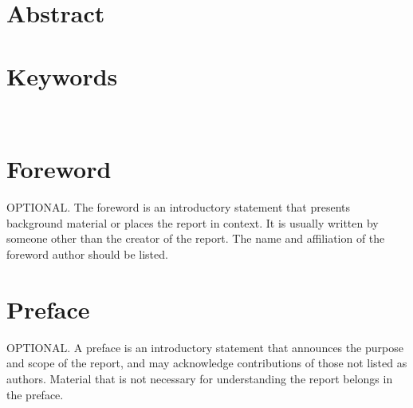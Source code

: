 \begin{titlepage}
\thispagestyle{fancy}
\renewcommand{\headrulewidth}{0pt}
  \fancyhead{}
  \fancyhead[l]{\small \pubnumber \\ 
	\small \pubmonth~\pubyear \\}
	\fancyfoot[c]{\thepage}
\section*{Abstract}
\pubabstract
\section*{Keywords}
\keywords
\newpage
\vspace*{-3cm}\small{\pubnumber \newline  \pubmonth~\pubyear}
\vspace{18pt}
\begin{center}
	\tableofcontents
	\appendixtitleon
    \appendixtitletocon
	\listoftables
	\listoffigures
	\end{center}
\pagebreak
\thispagestyle{fancy}
\renewcommand{\headrulewidth}{0pt}
  \fancyhead{}
  \fancyhead[l]{\small \pubnumber \\ 
	\small \pubmonth~\pubyear \\}
	\fancyfoot[c]{\thepage}
\section*{Foreword}
OPTIONAL. The foreword is an introductory statement that presents background material or places the report in context. It is usually written by someone other than the creator of the report. The name and affiliation of the foreword author should be listed.
\section*{Preface}
OPTIONAL. A preface is an introductory statement that announces the purpose and scope of the report, and may acknowledge contributions of those not listed as authors. Material that is not necessary for understanding the report belongs in the preface. 

\end{titlepage}
